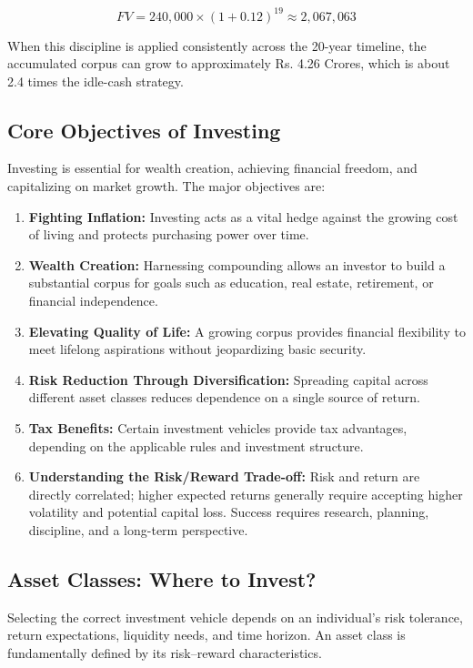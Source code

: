 \documentclass[12pt,openany]{book}
\begin{document}
\begin{equation*}
    FV = 240{,}000 \times (1 + 0.12)^{19} \approx 2{,}067{,}063
\end{equation*}

When this discipline is applied consistently across the 20-year timeline, the accumulated corpus can grow to approximately Rs. 4.26 Crores, which is about 2.4 times the idle-cash strategy.

\subsection{Core Objectives of Investing}
Investing is essential for wealth creation, achieving financial freedom, and capitalizing on market growth. The major objectives are:

\begin{enumerate}[leftmargin=*]
    \item \textbf{Fighting Inflation:} Investing acts as a vital hedge against the growing cost of living and protects purchasing power over time.
    \item \textbf{Wealth Creation:} Harnessing compounding allows an investor to build a substantial corpus for goals such as education, real estate, retirement, or financial independence.
    \item \textbf{Elevating Quality of Life:} A growing corpus provides financial flexibility to meet lifelong aspirations without jeopardizing basic security.
    \item \textbf{Risk Reduction Through Diversification:} Spreading capital across different asset classes reduces dependence on a single source of return.
    \item \textbf{Tax Benefits:} Certain investment vehicles provide tax advantages, depending on the applicable rules and investment structure.
    \item \textbf{Understanding the Risk/Reward Trade-off:} Risk and return are directly correlated; higher expected returns generally require accepting higher volatility and potential capital loss. Success requires research, planning, discipline, and a long-term perspective.
\end{enumerate}

\subsection{Asset Classes: Where to Invest?}
Selecting the correct investment vehicle depends on an individual's risk tolerance, return expectations, liquidity needs, and time horizon. An asset class is fundamentally defined by its risk--reward characteristics.
\end{document}
